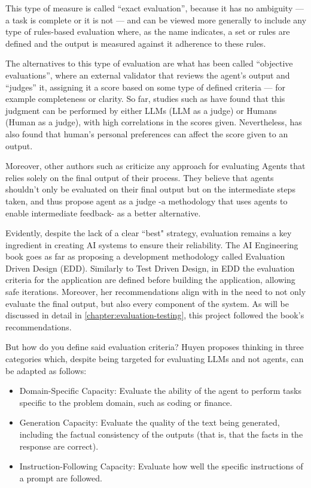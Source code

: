 \documentclass[a4paper]{report}
\begin{document}
This type of measure is called ``exact evaluation'', because it has no ambiguity --- a task is complete or it is not --- and can be viewed more generally to include any type of rules-based evaluation where, as the name indicates, a set or rules are defined and the output is measured against it adherence to these rules.

The alternatives to this type of evaluation are what has been called ``objective evaluations'', where an external validator that reviews the agent's output and ``judges'' it, assigning it a score based on some type of defined criteria --- for example completeness or clarity. So far, studies such as \cite{wang2025replacehumanevaluators} have found that this judgment can be performed by either LLMs (LLM as a judge) or Humans (Human as a judge), with high correlations in the scores given. Nevertheless, \cite{hu2023decipher} has also found that human's personal preferences can affect the score given to an output.

Moreover, other authors such as \cite{zhuge2024agentasajudgeevaluateagentsagents} criticize any approach for evaluating Agents that relies solely on the final output of their process. They believe that agents shouldn't only be evaluated on their final output but on the intermediate steps taken, and thus propose agent as a judge -a methodology that uses agents to enable intermediate feedback- as a better alternative.

Evidently, despite the lack of a clear ``best" strategy, evaluation remains a key ingredient in creating AI systems to ensure their reliability. The AI Engineering book goes as far as proposing a development methodology called Evaluation Driven Design (EDD). Similarly to Test Driven Design, in EDD the evaluation criteria for the application are defined before building the application, allowing safe iterations. Moreover, her recommendations align with \cite{zhuge2024agentasajudgeevaluateagentsagents} in the need to not only evaluate the final output, but also every component of the system. As will be discussed in detail in \autoref{chapter:evaluation-testing}, this project followed the book's recommendations.

But how do you define said evaluation criteria? Huyen proposes thinking in three categories which, despite being targeted for evaluating LLMs and not agents, can be adapted as follows:

\begin{itemize}
    \item Domain-Specific Capacity: Evaluate the ability of the agent to perform tasks specific to the problem domain, such as coding or finance.
    \item Generation Capacity: Evaluate the quality of the text being generated, including the factual consistency of the outputs (that is, that the facts in the response are correct).
    \item Instruction-Following Capacity: Evaluate how well the specific instructions of a prompt are followed.
\end{itemize}
\end{document}
